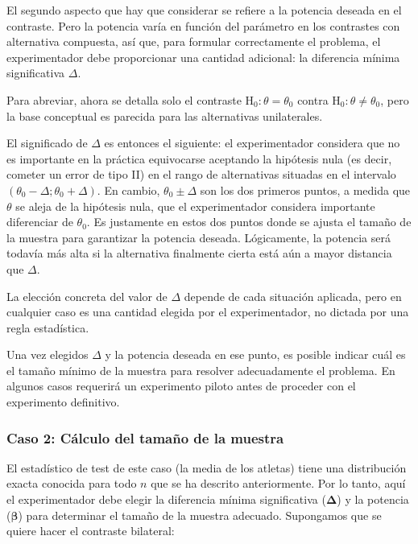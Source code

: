 \documentclass[
]{article}
\begin{document}
El segundo aspecto que hay que considerar se refiere a la potencia deseada en el contraste. Pero la potencia varía en función del parámetro en los contrastes con alternativa compuesta, así que, para formular correctamente el problema, el experimentador debe proporcionar una cantidad adicional: la diferencia mínima significativa \(\Delta\).

Para abreviar, ahora se detalla solo el contraste \(\mathrm{H}_{0}: \theta=\theta_{0}\) contra \(\mathrm{H}_{0}: \theta \neq \theta_{0}\), pero la base conceptual es parecida para las alternativas unilaterales.

El significado de \(\Delta\) es entonces el siguiente: el experimentador considera que no es importante en la práctica equivocarse aceptando la hipótesis nula (es decir, cometer un error de tipo II) en el rango de alternativas situadas en el intervalo \((\theta_{0}-\Delta ; \theta_{0}+\Delta)\). En cambio, \(\theta_{0} \pm \Delta\) son los dos primeros puntos, a medida que \(\theta\) se aleja de la hipótesis nula, que el experimentador considera importante diferenciar de \(\theta_{0}\). Es justamente en estos dos puntos donde se ajusta el tamaño de la muestra para garantizar la potencia deseada. Lógicamente, la potencia será todavía más alta si la alternativa finalmente cierta está aún a mayor distancia que \(\Delta\).

La elección concreta del valor de \(\Delta\) depende de cada situación aplicada, pero en cualquier caso es una cantidad elegida por el experimentador, no dictada por una regla estadística.

Una vez elegidos \(\Delta\) y la potencia deseada en ese punto, es posible indicar cuál es el tamaño mínimo de la muestra para resolver adecuadamente el problema. En algunos casos requerirá un experimento piloto antes de proceder con el experimento definitivo.

\subsubsection{Caso 2: Cálculo del tamaño de la muestra}\label{caso-2-cuxe1lculo-del-tamauxf1o-de-la-muestra}

El estadístico de test de este caso (la media de los atletas) tiene una distribución exacta conocida para todo \(n\) que se ha descrito anteriormente. Por lo tanto, aquí el experimentador debe elegir la diferencia mínima significativa (\(\boldsymbol{\Delta}\)) y la potencia (\(\boldsymbol{\beta}\)) para determinar el tamaño de la muestra adecuado. Supongamos que se quiere hacer el contraste bilateral:
\end{document}
